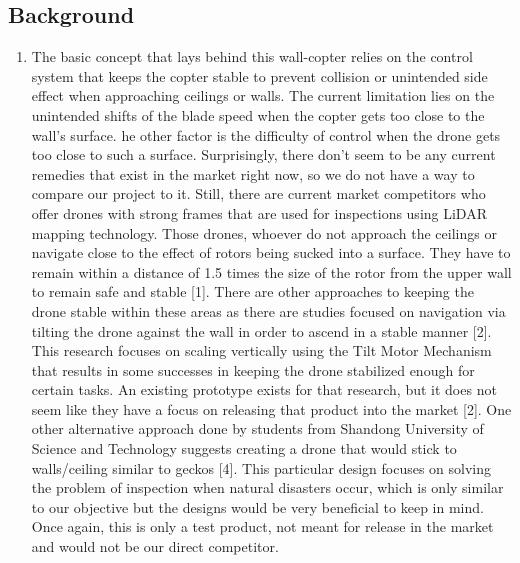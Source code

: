 \documentclass[12pt]{article}
\begin{document}
        \subsection{Background}
            \begin{enumerate}[label=\Alph*.]
                \item The basic concept that lays behind this wall-copter relies on the control system that keeps the copter stable to prevent collision or unintended side effect when approaching ceilings or walls.
                The current limitation lies on the unintended shifts of the blade speed when the copter gets too close to the wall's surface. 
                he other factor is the difficulty of control when the drone gets too close to such a surface.
                Surprisingly, there don't seem to be any current remedies that exist in the market right now, so we do not have a way to compare our project to it.
                Still, there are current market competitors who offer drones with strong frames that are used for inspections using LiDAR mapping technology.
                Those drones, whoever do not approach the ceilings or navigate close to the effect of rotors being sucked into a surface.
                They have to remain within a distance of 1.5 times the size of the rotor from the upper wall to remain safe and stable [1].
                There are other approaches to keeping the drone stable within these areas as there are studies focused on navigation via tilting the drone against the wall in order to ascend in a stable manner [2].
                This research focuses on scaling vertically using the Tilt Motor Mechanism that results in some successes in keeping the drone stabilized enough for certain tasks.
                An existing prototype exists for that research, but it does not seem like they have a focus on releasing that product into the market [2].
                One other alternative approach done by students from Shandong University of Science and Technology suggests creating a drone that would stick to walls/ceiling similar to geckos [4].
                This particular design focuses on solving the problem of inspection when natural disasters occur, which is only similar to our objective but the designs would be very beneficial to keep in mind.
                Once again, this is only a test product, not meant for release in the market and would not be our direct competitor.
                

\end{enumerate}
\end{document}
